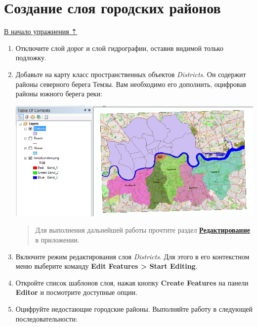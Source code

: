 \documentclass[12pt,]{book}
\begin{document}
\hypertarget{map-ref-economic-regions}{%
\section{Создание слоя городских районов}\label{map-ref-economic-regions}}

\protect\hyperlink{map-ref-economic}{В начало упражнения ⇡}

\begin{enumerate}
\def\labelenumi{\arabic{enumi}.}
\item
  Отключите слой дорог и слой гидрографии, оставив видимой только подложку.
\item
  Добавьте на карту класс пространственных объектов \emph{Districts}. Он содержит районы северного берега Темзы. Вам необходимо его дополнить, оцифровав районы южного берега реки:

  \includegraphics{images/Ex07/image12.png}

  \begin{quote}
  Для выполнения дальнейшей работы прочтите раздел \textbf{\protect\hyperlink{manual-edit}{Редактирование}} в приложении.
  \end{quote}
\item
  Включите режим редактирования слоя \emph{Districts}. Для этого в его контекстном меню выберите команду \textbf{Edit Features \textgreater{} Start Editing}.
\item
  Откройте список шаблонов слоя, нажав кнопку \textbf{Create Features} на панели \textbf{Editor} и посмотрите доступные опции.
\item
  Оцифруйте недостающие городские районы. Выполняйте работу в следующей последовательности:


\end{enumerate}
\end{document}
